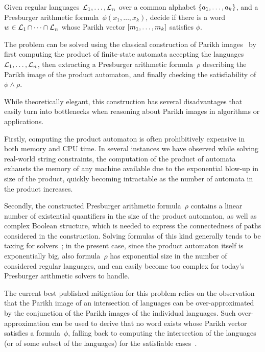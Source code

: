 {
    \centering
    \begin{tcolorbox}[colback=gray!5!white,colframe=gray!75!black,%
        title=Joint satisfiability of Parikh images modulo Presburger arithmetic constraints,%
        width=0.9\linewidth]
        Given regular languages~$\operatorname{\mathcal{L}}_1, \ldots, \operatorname{\mathcal{L}}_n$
        over a common alphabet $\left\{a_1, \ldots, a_k\right\}$,
        and a Presburger arithmetic formula~$\phi(x_1, \ldots, x_k)$, 
        decide if there is a word~$w \in \operatorname{\mathcal{L}}_1 \cap
        \cdots \cap \operatorname{\mathcal{L}}_n$ whose Parikh vector 
        $\left[{m_1, \ldots, m_k}\right]$ satisfies $\phi$.
    \end{tcolorbox}
}

The problem can be solved using the classical construction of Parikh
images~\cite{muscholl-linear,generate-parikh-image} by first computing
the product of finite-state automata accepting the
languages~$\operatorname{\mathcal{L}}_1, \ldots, \operatorname{\mathcal{L}}_n$, then extracting a
Presburger arithmetic formula~$\rho$ describing the Parikh image of the product
automaton, and finally checking the satisfiability of $\phi \wedge \rho$.
  
While theoretically elegant, this construction has several
disadvantages that easily turn into bottlenecks when reasoning about
Parikh images in algorithms or applications.

Firstly, computing the product automaton is often prohibitively
expensive in both memory and CPU time.  In several instances we have
observed while solving real-world string constraints, the computation
of the product of automata exhausts the memory of any machine
available due to the exponential blow-up in size of the product,
quickly becoming intractable as the number of automata in the product
increases.

Secondly, the constructed Presburger arithmetic formula~$\rho$ contains a linear
number of existential quantifiers in the size of the product
automaton, as well as complex Boolean structure, which is needed to
express the connectedness of paths considered in the construction.
Solving formulas of this kind generally tends to be taxing for
solvers~\cite{ostrich-plus}; in the present case, since the product
automaton itself is exponentially big, also formula~$\rho$ has
exponential size in the number of considered regular languages, and
can easily become too complex for today's Presburger arithmetic
solvers to handle.
  
The current best published mitigation for this problem relies on the
observation that the Parikh image of an intersection of languages can
be over-approximated by the conjunction of the Parikh images of the
individual languages. Such over-approximation can be used to derive
that no word exists whose Parikh vector satisfies a formula~$\phi$,
falling back to computing the intersection of the languages (or of
some subset of the languages) for the satisfiable
cases~\cite{approximate-parikh}.

